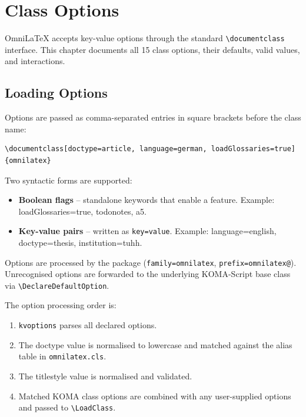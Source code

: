 \chapter{Class Options}
\label{ch:class-options}

OmniLaTeX accepts key-value options through the standard
\texttt{\textbackslash documentclass} interface.  This chapter documents all
15 class options, their defaults, valid values, and interactions.

\section{Loading Options}

Options are passed as comma-separated entries in square brackets before the
class name:

\begin{verbatim}
\documentclass[doctype=article, language=german, loadGlossaries=true]{omnilatex}
\end{verbatim}

Two syntactic forms are supported:

\begin{itemize}
    \item \textbf{Boolean flags} -- standalone keywords that enable a
          feature.  Example: \textsf{loadGlossaries=true},
          \textsf{todonotes}, \textsf{a5}.
    \item \textbf{Key-value pairs} -- written as
          \texttt{key=value}.  Example: \textsf{language=english},
          \textsf{doctype=thesis}, \textsf{institution=tuhh}.
\end{itemize}

Options are processed by the  package
(\texttt{family=omnilatex}, \texttt{prefix=omnilatex@}).  Unrecognised
options are forwarded to the underlying KOMA-Script base class via
\texttt{\textbackslash DeclareDefaultOption}.

The option processing order is:

\begin{enumerate}
    \item \texttt{kvoptions} parses all declared options.
    \item The \textsf{doctype} value is normalised to lowercase and matched
          against the alias table in \texttt{omnilatex.cls}.
    \item The \textsf{titlestyle} value is normalised and validated.
    \item Matched KOMA class options are combined with any user-supplied
          options and passed to \texttt{\textbackslash LoadClass}.
\end{enumerate}

